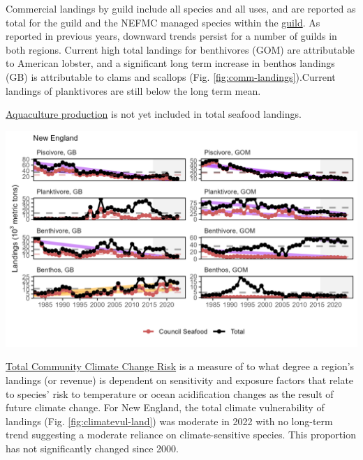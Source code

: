 \documentclass[
  10pt,
]{article}
\let\origfigure\figure
\let\endorigfigure\endfigure
\renewenvironment{figure}[1][2] {
    \expandafter\origfigure\expandafter[H]
} {
    \endorigfigure
}
\begin{document}
Commercial landings by guild include all species and all uses, and are reported as total for the guild and the NEFMC managed species within the \href{https://noaa-edab.github.io/catalog/aggregate_biomass.html}{guild}. As reported in previous years, downward trends persist for a number of guilds in both regions. Current high total landings for benthivores (GOM) are attributable to American lobster, and a significant long term increase in benthos landings (GB) is attributable to clams and scallops (Fig. \ref{fig:comm-landings}).Current landings of planktivores are still below the long term mean.

\href{https://noaa-edab.github.io/catalog/aquaculture.html}{Aquaculture production} is not yet included in total seafood landings.

\begin{figure}

{\centering \includegraphics[width=6.5in]{images/NewEngland/commercial_landings_NewEngland_2025-09-09} 

}

\caption{Total commercial landings (black) and NEFMC managed U.S seafood landings (red) by feeding guild for the Gulf of Maine (GOM, right) and Georges Bank (GB, left).}\label{fig:comm-landings-47}
\end{figure}

\href{https://noaa-edab.github.io/catalog/community_climate_vulnerability.html}{Total Community Climate Change Risk} is a measure of to what degree a region's landings (or revenue) is dependent on sensitivity and exposure factors that relate to species' risk to temperature or ocean acidification changes as the result of future climate change. For New England, the total climate vulnerability of landings (Fig. \ref{fig:climatevul-land}) was moderate in 2022 with no long-term trend suggesting a moderate reliance on climate-sensitive species. This proportion has not significantly changed since 2000.
\end{document}
